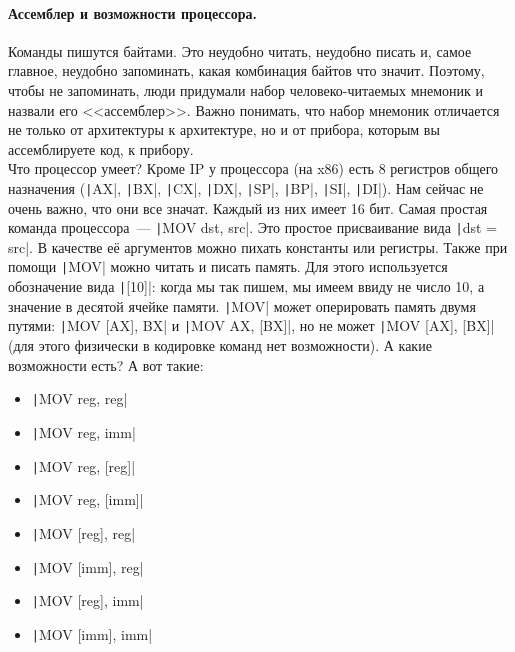 \documentclass{article}
\begin{document}
    \paragraph{Ассемблер и возможности процессора.}
    Команды пишутся байтами. Это неудобно читать, неудобно писать и, самое главное, неудобно запоминать, какая комбинация байтов что значит. Поэтому, чтобы не запоминать, люди придумали набор человеко-читаемых мнемоник и назвали его <<ассемблер>>. Важно понимать, что набор мнемоник отличается не только от архитектуры к архитектуре, но и от прибора, которым вы ассемблируете код, к прибору.\\
    Что процессор умеет? Кроме IP у процессора (на x86) есть 8 регистров общего назначения (\texttt|AX|, \texttt|BX|, \texttt|CX|, \texttt|DX|, \texttt|SP|, \texttt|BP|, \texttt|SI|, \texttt|DI|). Нам сейчас не очень важно, что они все значат. Каждый из них имеет 16 бит. Самая простая команда процессора~--- \texttt|MOV dst, src|. Это простое присваивание вида \texttt|dst = src|. В качестве её аргументов можно пихать константы или регистры. Также при помощи \texttt|MOV| можно читать и писать память. Для этого используется обозначение вида \texttt|[10]|: когда мы так пишем, мы имеем ввиду не число 10, а значение в десятой ячейке памяти. \texttt|MOV| может оперировать память двумя путями: \texttt|MOV [AX], BX| и \texttt|MOV AX, [BX]|, но не может \texttt|MOV [AX], [BX]| (для этого физически в кодировке команд нет возможности). А какие возможности есть? А вот такие:
    \begin{itemize}
        \item \texttt|MOV reg, reg|
        \item \texttt|MOV reg, imm|
        \item \texttt|MOV reg, [reg]|
        \item \texttt|MOV reg, [imm]|
        \item \texttt|MOV [reg], reg|
        \item \texttt|MOV [imm], reg|
        \item \texttt|MOV [reg], imm|
        \item \texttt|MOV [imm], imm|
    \end{itemize}
\end{document}
